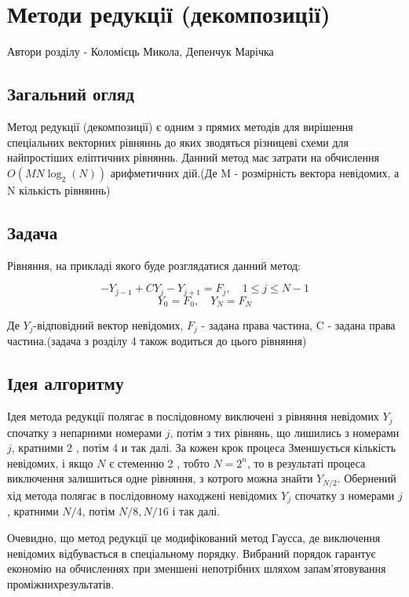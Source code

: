 \chapter{Методи редукцiї (декомпозицiї)}

Автори розділу - Коломієць Микола, Депенчук Марічка

\section{Загальний огляд}

Метод редукції (декомпозиції) є одним з прямих методів для 
вирішення спеціальних векторних рівняннь до яких зводяться 
різницеві схеми для найпростіших еліптичних рівняннь. Данний метод має 
затрати на обчислення $O(MN\log_2(N))$ арифметичних дій.(Де M - розмірність 
вектора невідомих, а N кількість рівняннь)

\section{Задача}

Рівняння, на прикладі якого буде розглядатися данний метод:

$$-Y_{j-1} +CY_j - Y_{j+1} =F_j, \quad 1\le j \le N-1$$
$$Y_0 = F_0, \quad Y_N = F_N$$

Де $Y_j$-відповідний вектор невідомих, $F_j$ - задана права частина, 
C - задана права частина.(задача з розділу 4 також водиться до цього рівняння)

\section{Ідея алгоритму}

Ідея метода редукції полягає в послідовному виключені з рівняння невідомих 
$Y_j$ спочатку з непарними номерами $j$, потім з тих рівнянь, 
що лишились з номерами $j$, кратними 2 , потім 4 и так далі. За кожен крок 
процеса  Зменшується кількість невідомих, і якщо $N$ є стеменню 2 , тобто 
$N=2^n$, то в результаті процеса виключення залишиться одне рівняння, з 
котрого можна знайти $Y_{N / 2}$. 
Обернений хід метода полягає в послідовному находжені невідомих $Y_j$ 
спочатку з номерами $j$, кратними $N / 4$, потім $N / 8, N / 16$ і так далі.


Очевидно, що метод редукції це модифікований метод Гаусса, де виключення 
невідомих відбувається в спеціальному порядку. Вибраний порядок гарантує 
економію на обчисленнях при зменшені непотрібних шляхом запам'ятовування 
проміжнихрезультатів.

